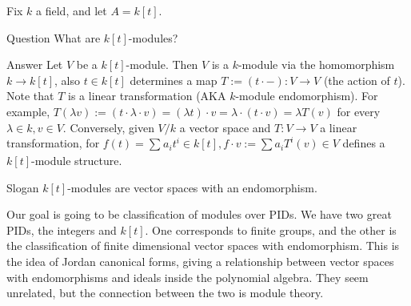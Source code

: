     Fix $k$ a field, and let $A=k[t]$. 
    \begin{namedthm}{Question} 
        What are $k[t]$-modules?  
    \end{namedthm}
    \begin{namedthing}{Answer} 
        Let $V$ be a $k[t]$-module. Then $V$ is a $k$-module via the homomorphism $k \to k[t]$, also $ t\in k[t]$ determines a map $T := (t \cdot  -) \colon V \to V$ (the action of $t$). Note  that $T$ is a linear transformation (AKA $k$-module endomorphism). For example, $T(\lambda v):= (t \cdot \lambda\cdot v)=(\lambda t)\cdot v= \lambda \cdot (t \cdot v)=\lambda T(v) $ for every $\lambda \in k, v\in V$. Conversely, given $V /k$ a vector space and $T \colon V \to V$ a linear transformation, for $f (t)= \sum_{}^{} a_i  t ^i  \in k[t], f \cdot v := \sum a_i  T ^i (v) \in V$ defines a $k[t]$-module structure.
    \end{namedthing}
    \begin{namedthing}{Slogan} 
        $k[t]$-modules are vector spaces with an endomorphism. 
    \end{namedthing}
    Our goal is going to be classification of modules over PIDs. We have two great PIDs, the integers and $k[t]$. One corresponds to finite groups, and the other is the classification of finite dimensional vector spaces with endomorphism. This is the idea of Jordan canonical forms, giving a relationship between vector spaces with endomorphisms and ideals inside the polynomial algebra. They seem unrelated, but the connection between the two is module theory.

